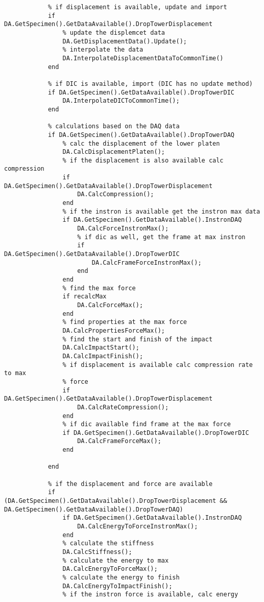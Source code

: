 \begin{lstlisting}
            % if displacement is available, update and import
            if DA.GetSpecimen().GetDataAvailable().DropTowerDisplacement
                % update the displemcet data
                DA.GetDisplacementData().Update(); 
                % interpolate the data
                DA.InterpolateDisplacementDataToCommonTime()
            end
            
            % if DIC is available, import (DIC has no update method)
            if DA.GetSpecimen().GetDataAvailable().DropTowerDIC
                DA.InterpolateDICToCommonTime();
            end
            
            % calculations based on the DAQ data 
            if DA.GetSpecimen().GetDataAvailable().DropTowerDAQ
                % calc the displacement of the lower platen
                DA.CalcDisplacementPlaten();                  
                % if the displacement is also available calc compression
                if DA.GetSpecimen().GetDataAvailable().DropTowerDisplacement
                    DA.CalcCompression();
                end
                % if the instron is available get the instron max data
                if DA.GetSpecimen().GetDataAvailable().InstronDAQ
                    DA.CalcForceInstronMax();
                    % if dic as well, get the frame at max instron
                    if DA.GetSpecimen().GetDataAvailable().DropTowerDIC
                        DA.CalcFrameForceInstronMax();
                    end      
                end
                % find the max force
                if recalcMax
                    DA.CalcForceMax();
                end
                % find properties at the max force
                DA.CalcPropertiesForceMax();                
                % find the start and finish of the impact
                DA.CalcImpactStart();
                DA.CalcImpactFinish();
                % if displacement is available calc compression rate to max
                % force
                if DA.GetSpecimen().GetDataAvailable().DropTowerDisplacement
                    DA.CalcRateCompression();
                end               
                % if dic available find frame at the max force
                if DA.GetSpecimen().GetDataAvailable().DropTowerDIC
                    DA.CalcFrameForceMax();
                end                
              
            end
            
            % if the displacement and force are available
            if (DA.GetSpecimen().GetDataAvailable().DropTowerDisplacement && DA.GetSpecimen().GetDataAvailable().DropTowerDAQ)
                if DA.GetSpecimen().GetDataAvailable().InstronDAQ
                    DA.CalcEnergyToForceInstronMax();
                end               
                % calculate the stiffness
                DA.CalcStiffness();
                % calculate the energy to max
                DA.CalcEnergyToForceMax();
                % calculate the energy to finish
                DA.CalcEnergyToImpactFinish();
                % if the instron force is available, calc energy


\end{lstlisting}
